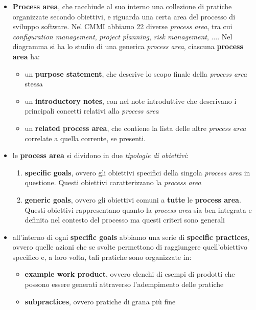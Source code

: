 \begin{itemize} 
    \item \textbf{Process area}, che racchiude al suo interno una collezione di pratiche organizzate secondo obiettivi, e riguarda una certa area del processo di sviluppo software. Nel CMMI abbiamo 22 diverse \textit{process area}, tra cui \textit{configuration management}, \textit{project planning}, \textit{risk management}, $\dots$. Nel diagramma si ha lo studio di una generica \textit{process area}, ciascuna \textbf{process area} ha: 
        \begin{itemize} 
            \item un \textbf{purpose statement}, che descrive lo scopo finale della \textit{process area} stessa 
            \item un \textbf{introductory notes}, con nel note introduttive che descrivano i principali concetti relativi alla \textit{process area} 
            \item un \textbf{related process area}, che contiene la lista delle altre \textit{process area} correlate a quella corrente, se presenti.
        \end{itemize} 
    \item le \textbf{process area} si dividono in due \textit{tipologie di obiettivi}: 
        \begin{enumerate} 
            \item \textbf{specific goals}, ovvero gli obiettivi specifici della singola \textit{process area} in questione. Questi obiettivi caratterizzano la \textit{process area} 
            \item \textbf{generic goals}, ovvero gli obiettivi comuni a \textbf{tutte} le \textbf{process area}. Questi obiettivi rappresentano quanto la \textit{process area} sia ben integrata e definita nel contesto del processo ma questi criteri sono generali 
        \end{enumerate} 
    \item all'interno di ogni \textbf{specific goals} abbiamo una serie di \textbf{specific practices}, ovvero quelle azioni che se svolte permettono di raggiungere quell'obiettivo specifico e, a loro volta, tali pratiche sono organizzate in: 
        \begin{itemize} 
            \item \textbf{example work product}, ovvero elenchi di esempi di prodotti che possono essere generati attraverso l'adempimento delle pratiche 
            \item \textbf{subpractices}, ovvero pratiche di grana più fine

\end{itemize}
\end{itemize}
